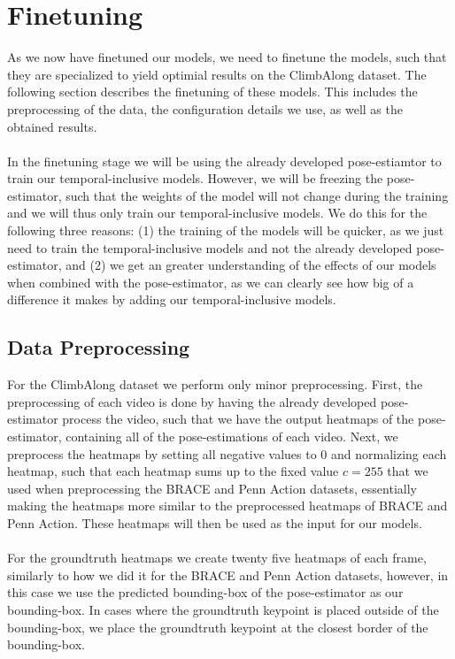 \documentclass[./main.tex]{subfiles}
\begin{document}
\section{Finetuning}
\label{sec:finetuning}
As we now have finetuned our models, we need to finetune the models, such that they are specialized to yield optimial results on the ClimbAlong dataset. The following section describes the finetuning of these models. This includes the preprocessing of the data, the configuration details we use, as well as the obtained results.
\\
\\
In the finetuning stage we will be using the already developed pose-estiamtor to train our temporal-inclusive models. However, we will be freezing the pose-estimator, such that the weights of the model will not change during the training and we will thus only train our temporal-inclusive models. We do this for the following three reasons: (1) the training of the models will be quicker, as we just need to train the temporal-inclusive models and not the already developed pose-estimator, and (2) we get an greater understanding of the effects of our models when combined with the pose-estimator, as we can clearly see how big of a difference it makes by adding our temporal-inclusive models.

\subsection{Data Preprocessing}
For the ClimbAlong dataset we perform only minor preprocessing. First, the preprocessing of each video is done by having the already developed pose-estimator process the video, such that we have the output heatmaps of the pose-estimator, containing all of the pose-estimations of each video. Next, we preprocess the heatmaps by setting all negative values to $0$ and normalizing each heatmap, such that each heatmap sums up to the fixed value $c = 255$ that we used when preprocessing the BRACE and Penn Action datasets, essentially making the heatmaps more similar to the preprocessed heatmaps of BRACE and Penn Action. These heatmaps will then be used as the input for our models.
\\
\\
For the groundtruth heatmaps we create twenty five heatmaps of each frame, similarly to how we did it for the BRACE and Penn Action datasets, however, in this case we use the predicted bounding-box of the pose-estimator as our bounding-box. In cases where the groundtruth keypoint is placed outside of the bounding-box, we place the groundtruth keypoint at the closest border of the bounding-box.
\end{document}
